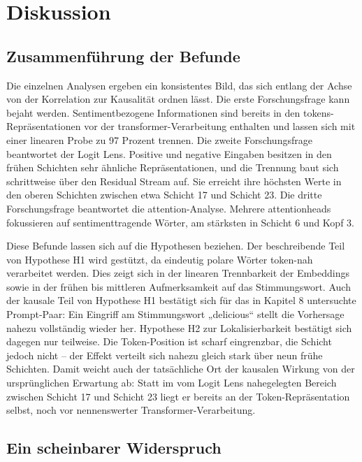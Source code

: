 \section{Diskussion}

\subsection{Zusammenführung der Befunde}

Die einzelnen Analysen ergeben ein konsistentes Bild, das sich entlang der Achse von der Korrelation zur Kausalität ordnen lässt. Die erste Forschungsfrage kann bejaht werden. Sentimentbezogene Informationen sind bereits in den \glspl{token}-Repräsentationen vor der \gls{transformer}-Verarbeitung enthalten und lassen sich mit einer linearen Probe zu 97 Prozent trennen. Die zweite Forschungsfrage beantwortet der Logit Lens. Positive und negative Eingaben besitzen in den frühen Schichten sehr ähnliche Repräsentationen, und die Trennung baut sich schrittweise über den Residual Stream auf. Sie erreicht ihre höchsten Werte in den oberen Schichten zwischen etwa Schicht 17 und Schicht 23. Die dritte Forschungsfrage beantwortet die \gls{attention}-Analyse. Mehrere \glspl{attentionhead} fokussieren auf sentimenttragende Wörter, am stärksten in Schicht 6 und Kopf 3.

Diese Befunde lassen sich auf die Hypothesen beziehen. Der beschreibende Teil von Hypothese H1 wird gestützt, da eindeutig polare Wörter token-nah verarbeitet werden. Dies zeigt sich in der linearen Trennbarkeit der Embeddings sowie in der frühen bis mittleren Aufmerksamkeit auf das Stimmungswort. Auch der kausale Teil von Hypothese H1 bestätigt sich für das in Kapitel 8 untersuchte Prompt-Paar: Ein Eingriff am Stimmungswort „delicious“ stellt die Vorhersage nahezu vollständig wieder her. Hypothese H2 zur Lokalisierbarkeit bestätigt sich dagegen nur teilweise. Die Token-Position ist scharf eingrenzbar, die Schicht jedoch nicht -- der Effekt verteilt sich nahezu gleich stark über neun frühe Schichten. Damit weicht auch der tatsächliche Ort der kausalen Wirkung von der ursprünglichen Erwartung ab: Statt im vom Logit Lens nahegelegten Bereich zwischen Schicht 17 und Schicht 23 liegt er bereits an der Token-Repräsentation selbst, noch vor nennenswerter Transformer-Verarbeitung.

\subsection{Ein scheinbarer Widerspruch}

